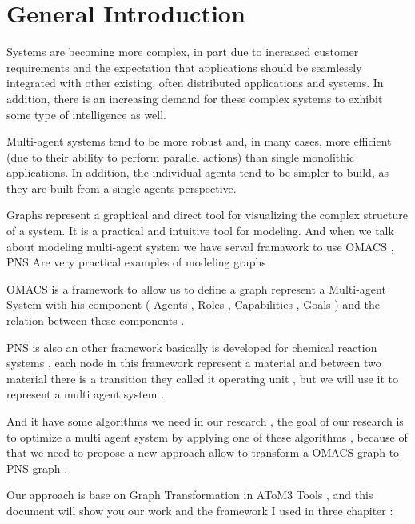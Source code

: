 
\chapter*{General Introduction}





\textbf{}


Systems are becoming more complex, in part due to increased customer requirements and the
expectation that applications should be seamlessly integrated with other existing, often distributed
applications and systems. In addition, there is an increasing demand for these complex systems to
exhibit some type of intelligence as well.


Multi-agent systems tend to be more robust and, in many cases, more efficient (due to their ability to perform parallel actions) than single monolithic applications. In addition, the individual agents tend to be simpler to build, as they are built from a single agents perspective.


Graphs represent a graphical and direct tool for visualizing the complex structure of a system. It is a practical and intuitive tool for modeling. And when we talk about modeling multi-agent system we have serval framawork to use OMACS , PNS  Are very practical examples of modeling graphs


OMACS  is  a framework to allow us  to define a graph represent a Multi-agent System with his component ( Agents , Roles , Capabilities , Goals ) and the relation between these components .
 
 	
PNS is also an other framework  basically is developed for chemical reaction systems , each node in this framework represent a material and between two material there is a transition they called it operating unit , but we will use it  to represent a multi agent system . 


And it have some algorithms we need in our research ,  the goal of our research is to optimize a multi agent system by applying one of these algorithms , because of that we need to propose a new approach allow to transform a OMACS graph to PNS graph  .


Our approach is base on Graph Transformation in AToM3 Tools  , and this document will show you our work and the framework I used  in three chapiter : 

